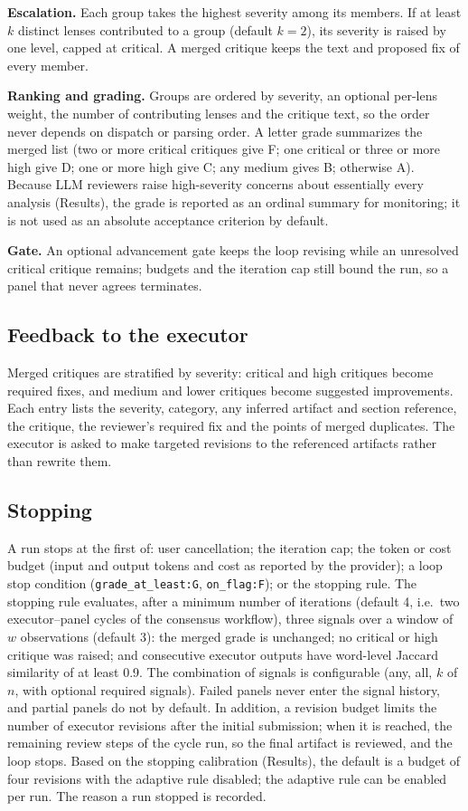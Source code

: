 \documentclass[10pt,letterpaper]{article}
\begin{document}
\textbf{Escalation.} Each group takes the highest severity among its members. If at least $k$ distinct lenses contributed to a group (default $k=2$), its severity is raised by one level, capped at critical. A merged critique keeps the text and proposed fix of every member.

\textbf{Ranking and grading.} Groups are ordered by severity, an optional per-lens weight, the number of contributing lenses and the critique text, so the order never depends on dispatch or parsing order. A letter grade summarizes the merged list (two or more critical critiques give F; one critical or three or more high give D; one or more high give C; any medium gives B; otherwise A). Because LLM reviewers raise high-severity concerns about essentially every analysis (Results), the grade is reported as an ordinal summary for monitoring; it is not used as an absolute acceptance criterion by default.

\textbf{Gate.} An optional advancement gate keeps the loop revising while an unresolved critical critique remains; budgets and the iteration cap still bound the run, so a panel that never agrees terminates.

\subsection*{Feedback to the executor}

Merged critiques are stratified by severity: critical and high critiques become required fixes, and medium and lower critiques become suggested improvements. Each entry lists the severity, category, any inferred artifact and section reference, the critique, the reviewer's required fix and the points of merged duplicates. The executor is asked to make targeted revisions to the referenced artifacts rather than rewrite them.

\subsection*{Stopping}

A run stops at the first of: user cancellation; the iteration cap; the token or cost budget (input and output tokens and cost as reported by the provider); a loop stop condition (\texttt{grade\_at\_least:G}, \texttt{on\_flag:F}); or the stopping rule. The stopping rule evaluates, after a minimum number of iterations (default 4, i.e.\ two executor--panel cycles of the consensus workflow), three signals over a window of $w$ observations (default 3): the merged grade is unchanged; no critical or high critique was raised; and consecutive executor outputs have word-level Jaccard similarity of at least 0.9. The combination of signals is configurable (any, all, $k$ of $n$, with optional required signals). Failed panels never enter the signal history, and partial panels do not by default. In addition, a revision budget limits the number of executor revisions after the initial submission; when it is reached, the remaining review steps of the cycle run, so the final artifact is reviewed, and the loop stops. Based on the stopping calibration (Results), the default is a budget of four revisions with the adaptive rule disabled; the adaptive rule can be enabled per run. The reason a run stopped is recorded.
\end{document}
